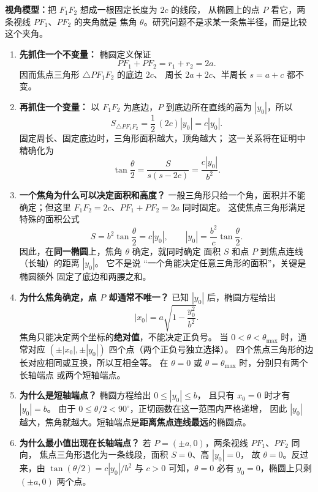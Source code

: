 \begin{explanationbox}
\textbf{视角模型：}把 $F_1F_2$ 想成一根固定长度为 $2c$ 的线段，
从椭圆上的点 $P$ 看它，两条视线 $PF_1$、$PF_2$ 的夹角就是
焦角 $\theta$。研究问题不是求某一条焦半径，而是比较这个夹角。

\begin{enumerate}
  \item \textbf{先抓住一个不变量：}
  椭圆定义保证
  \[
  PF_1+PF_2=r_1+r_2=2a.
  \]
  因而焦点三角形 $\triangle PF_1F_2$ 的底边 $2c$、
  周长 $2a+2c$、半周长 $s=a+c$ 都不变。

  \item \textbf{再抓住一个变量：}
  以 $F_1F_2$ 为底边，$P$ 到底边所在直线的高为 $|y_0|$，所以
  \[
  S_{\triangle PF_1F_2}=\frac12\,(2c)|y_0|=c|y_0|.
  \]
  固定周长、固定底边时，三角形面积越大，顶角越大；
  这一关系将在证明中精确化为
  \[
  \tan\frac\theta2=\frac{S}{s(s-2c)}
  =\frac{c|y_0|}{b^2}.
  \]

  \item \textbf{一个焦角为什么可以决定面积和高度？}
  一般三角形只给一个角，面积并不能确定；但这里
  $F_1F_2=2c$、$PF_1+PF_2=2a$ 同时固定。
  这使焦点三角形满足特殊的面积公式
  \[
  \boxed{S=b^2\tan\frac\theta2=c|y_0|},\qquad
  \boxed{|y_0|=\frac{b^2}{c}\tan\frac\theta2}.
  \]
  因此，在\textbf{同一椭圆}上，焦角 $\theta$ 确定，就同时确定
  面积 $S$ 和点 $P$ 到焦点连线（长轴）的距离 $|y_0|$。
  它不是说 ``一个角能决定任意三角形的面积''，关键是椭圆额外
  固定了底边和两腰之和。

  \item \textbf{为什么焦角确定，点 $P$ 却通常不唯一？}
  已知 $|y_0|$ 后，椭圆方程给出
  \[
  |x_0|=a\sqrt{1-\frac{y_0^2}{b^2}}.
  \]
  焦角只能决定两个坐标的\textbf{绝对值}，不能决定正负号。
  当 $0<\theta<\theta_{\max}$ 时，通常对应
  $(\pm|x_0|,\pm|y_0|)$ 四个点（两个正负号独立选择）。
  四个焦点三角形的边长对应相同或互换，所以互相全等。
  在 $\theta=0$ 或 $\theta=\theta_{\max}$ 时，分别只有两个长轴端点
  或两个短轴端点。

  \item \textbf{为什么是短轴端点？}
  椭圆方程给出 $0\leq|y_0|\leq b$，
  且只有 $x_0=0$ 时才有 $|y_0|=b$。
  由于 $0\leq\theta/2<90^\circ$，正切函数在这一范围内严格递增，
  因此 $|y_0|$ 越大，焦角就越大。短轴端点是\textbf{距离焦点连线最远}的椭圆点。

  \item \textbf{为什么最小值出现在长轴端点？}
  若 $P=(\pm a,0)$，两条视线 $PF_1$、$PF_2$ 同向，
  焦点三角形退化为一条线段，面积 $S=0$、高 $|y_0|=0$，
  故 $\theta=0$。反过来，由 $\tan(\theta/2)=c|y_0|/b^2$
  与 $c>0$ 可知，$\theta=0$ 必有 $y_0=0$，椭圆上只剩
  $(\pm a,0)$ 两个点。


\end{enumerate}
\end{explanationbox}
